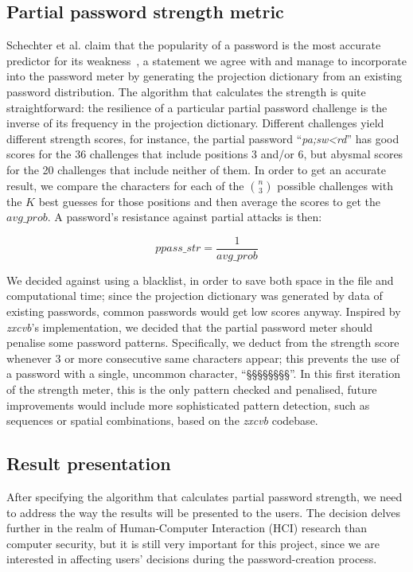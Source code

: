   \subsection{Partial password strength metric}
    \label{ssec:str_metric}
    Schechter et al. claim that the popularity of a password is the most accurate predictor for its weakness~\cite{pass_popularity}, a statement we agree with and manage to incorporate into the password meter by generating the projection dictionary from an existing password distribution. The algorithm that calculates the strength is quite straightforward: the resilience of a particular partial password challenge is the inverse of its frequency in the projection dictionary. Different challenges yield different strength scores, for instance, the partial password ``\emph{pa;sw<rd}'' has good scores for the 36 challenges that include positions 3 and/or 6, but abysmal scores for the 20 challenges that include neither of them. In order to get an accurate result, we compare the characters for each of the ${n \choose 3}$ possible challenges with the $K$ best guesses for those positions and then average the scores to get the $avg\_prob$. A password's resistance against partial attacks is then:

    \[ ppass\_str = \frac{1}{avg\_prob} \]

    We decided against using a blacklist, in order to save both space in the file and computational time; since the projection dictionary was generated by data of existing passwords, common passwords would get low scores anyway. Inspired by \emph{zxcvb}'s implementation, we decided that the partial password meter should penalise some password patterns. Specifically, we deduct from the strength score whenever 3 or more consecutive same characters appear; this prevents the use of a password with a single, uncommon character, \eg ``§§§§§§§§''. In this first iteration of the strength meter, this is the only pattern checked and penalised, future improvements would include more sophisticated pattern detection, such as sequences or spatial combinations, based on the \emph{zxcvb} codebase.

  \subsection{Result presentation}
    \label{ssec:result_presentation}
    After specifying the algorithm that calculates partial password strength, we need to address the way the results will be presented to the users. The decision delves further in the realm of Human-Computer Interaction (HCI) research than computer security, but it is still very important for this project, since we are interested in affecting users' decisions during the password-creation process.

